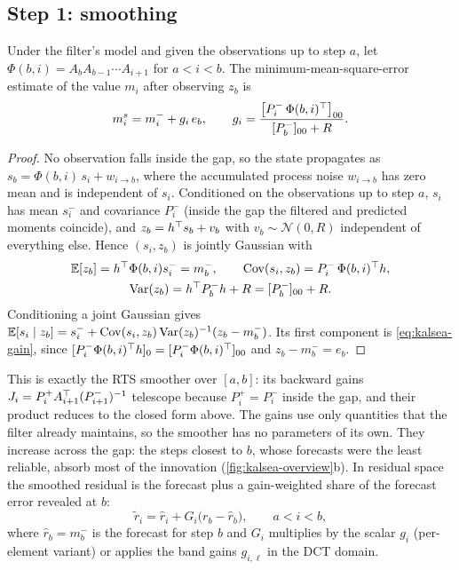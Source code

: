 \subsection{Step 1: smoothing}
\begin{proposition}\label{prop:kalsea-gain}
Under the filter's model and given the observations up to step $a$, let $\Phi(b,i) = A_bA_{b-1}\cdots A_{i+1}$ for $a<i<b$. The minimum-mean-square-error estimate of the value $m_i$ after observing $z_b$ is
\begin{equation}\label{eq:kalsea-gain}
  m^s_i = m^-_i + g_i\, e_b, \qquad g_i = \frac{\big[P^-_i\,\Phi(b,i)^{\top}\big]_{00}}{[P^-_b]_{00}+R} .
\end{equation}
\end{proposition}
\begin{proof}
No observation falls inside the gap, so the state propagates as $s_b = \Phi(b,i)\,s_i + w_{i\to b}$, where the accumulated process noise $w_{i\to b}$ has zero mean and is independent of $s_i$. Conditioned on the observations up to step $a$, $s_i$ has mean $s^-_i$ and covariance $P^-_i$ (inside the gap the filtered and predicted moments coincide), and $z_b = h^{\top} s_b + v_b$ with $v_b\sim\mathcal N(0,R)$ independent of everything else. Hence $(s_i,z_b)$ is jointly Gaussian with
\begin{equation}
  \begin{gathered}
  \mathbb{E}[z_b] = h^{\top}\Phi(b,i)s^-_i = m^-_b,\qquad \mathrm{Cov}(s_i,z_b) = P^-_i\,\Phi(b,i)^{\top} h,\\
  \mathrm{Var}(z_b) = h^{\top} P^-_b h + R = [P^-_b]_{00}+R .
  \end{gathered}
\end{equation}
Conditioning a joint Gaussian gives $\mathbb{E}[s_i\mid z_b] = s^-_i + \mathrm{Cov}(s_i,z_b)\,\mathrm{Var}(z_b)^{-1}(z_b-m^-_b)$. Its first component is \cref{eq:kalsea-gain}, since $[P^-_i\Phi(b,i)^{\top} h]_0 = [P^-_i\Phi(b,i)^{\top}]_{00}$ and $z_b-m^-_b=e_b$.
\end{proof}

This is exactly the RTS smoother \citep{rauch1965rts,sarkka2013bayesian} over $[a,b]$: its backward gains $J_i = P^+_iA_{i+1}^{\top}(P^-_{i+1})^{-1}$ telescope because $P^+_i=P^-_i$ inside the gap, and their product reduces to the closed form above. The gains use only quantities that the filter already maintains, so the smoother has no parameters of its own. They increase across the gap: the steps closest to $b$, whose forecasts were the least reliable, absorb most of the innovation (\cref{fig:kalsea-overview}b). In residual space the smoothed residual is the forecast plus a gain-weighted share of the forecast error revealed at $b$:
\begin{equation}\label{eq:kalsea-smooth}
  \tilde r_i = \hat r_i + G_i\big(r_b - \hat r_b\big), \qquad a<i<b,
\end{equation}
where $\hat r_b = m^-_b$ is the forecast for step $b$ and $G_i$ multiplies by the scalar $g_i$ (per-element variant) or applies the band gains $g_{i,\ell}$ in the DCT domain.

